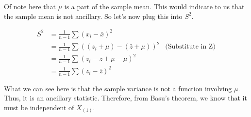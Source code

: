 Of note here that $\mu$ is a part of the sample mean. This would indicate to us that the sample mean is not ancillary. So let's now plug this into $S^2$.

\begin{align*}
	S^2 &= \frac{1}{n-1} \sum (x_i - \bar{x})^2 \\
	&= \frac{1}{n-1} \sum \left( (z_i + \mu) - (\bar{z} + \mu) \right)^2 & \text{(Substitute in Z)} \\
	&= \frac{1}{n-1} \sum \left( z_i - \bar{z} + \mu - \mu \right)^2 \\
	&= \frac{1}{n-1} \sum (z_i - \bar{z})^2
\end{align*}

What we can see here is that the sample variance is not a function involving $\mu$. Thus, it is an ancillary statistic. Therefore, from Basu's theorem, we know that it must be independent of $X_{(1)}$.
